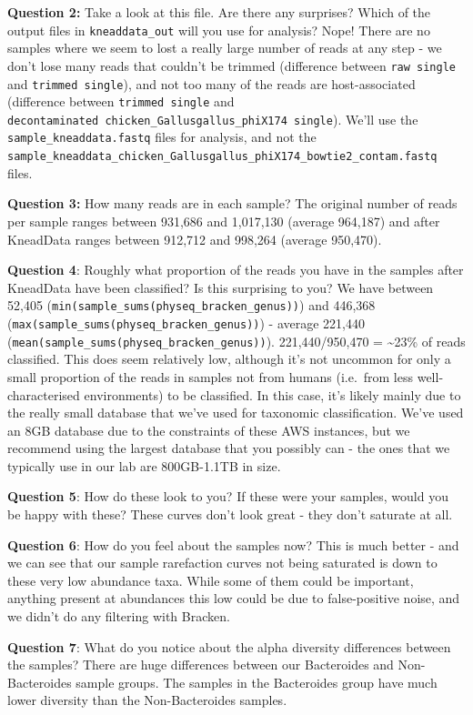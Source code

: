 \documentclass[
]{book}
\begin{document}
\textbf{Question 2:} Take a look at this file. Are there any surprises? Which of the output files in \texttt{kneaddata\_out} will you use for analysis?
Nope! There are no samples where we seem to lost a really large number of reads at any step - we don't lose many reads that couldn't be trimmed (difference between \texttt{raw\ single} and \texttt{trimmed\ single}), and not too many of the reads are host-associated (difference between \texttt{trimmed\ single} and \texttt{decontaminated\ chicken\_Gallusgallus\_phiX174\ single}). We'll use the \texttt{sample\_kneaddata.fastq} files for analysis, and not the \texttt{sample\_kneaddata\_chicken\_Gallusgallus\_phiX174\_bowtie2\_contam.fastq} files.

\textbf{Question 3:} How many reads are in each sample?
The original number of reads per sample ranges between 931,686 and 1,017,130 (average 964,187) and after KneadData ranges between 912,712 and 998,264 (average 950,470).

\textbf{Question 4}: Roughly what proportion of the reads you have in the samples after KneadData have been classified? Is this surprising to you?
We have between 52,405 (\texttt{min(sample\_sums(physeq\_bracken\_genus))}) and 446,368 (\texttt{max(sample\_sums(physeq\_bracken\_genus))}) - average 221,440 (\texttt{mean(sample\_sums(physeq\_bracken\_genus))}). 221,440/950,470 = \textasciitilde23\% of reads classified. This does seem relatively low, although it's not uncommon for only a small proportion of the reads in samples not from humans (i.e.~from less well-characterised environments) to be classified. In this case, it's likely mainly due to the really small database that we've used for taxonomic classification. We've used an 8GB database due to the constraints of these AWS instances, but we recommend using the largest database that you possibly can - the ones that we typically use in our lab are 800GB-1.1TB in size.

\textbf{Question 5}: How do these look to you? If these were your samples, would you be happy with these?
These curves don't look great - they don't saturate at all.

\textbf{Question 6}: How do you feel about the samples now?
This is much better - and we can see that our sample rarefaction curves not being saturated is down to these very low abundance taxa. While some of them could be important, anything present at abundances this low could be due to false-positive noise, and we didn't do any filtering with Bracken.

\textbf{Question 7}: What do you notice about the alpha diversity differences between the samples?
There are huge differences between our Bacteroides and Non-Bacteroides sample groups. The samples in the Bacteroides group have much lower diversity than the Non-Bacteroides samples.
\end{document}
